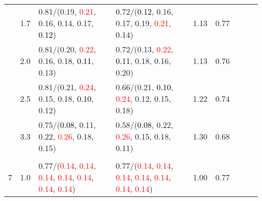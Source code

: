 \documentclass[10pt,a4paper]{report}
\begin{document}
\begin{table}[!htbp]
\begin{center}
{\begin{tabular}{ccllccccc}
				  & 1.7                               & 0.81/(0.19, \textcolor{red}{0.21}, 0.16, 0.14, 0.17, \textcolor{black}{0.12})                                                                                                                 & 0.72/(\textcolor{black}{0.12}, 0.16, 0.17, 0.19, \textcolor{red}{0.21}, 0.14)                                                                                                                 & 1.13             & 0.77                     \\
				  & 2.0                               & 0.81/(0.20, \textcolor{red}{0.22}, 0.16, 0.18, \textcolor{black}{0.11}, 0.13)                                                                                                                 & 0.72/(0.13, \textcolor{red}{0.22}, \textcolor{black}{0.11}, 0.18, 0.16, 0.20)                                                                                                                 & 1.13             & 0.76                     \\
				  & 2.5                               & 0.81/(0.21, \textcolor{red}{0.24}, 0.15, 0.18, \textcolor{black}{0.10}, 0.12)                                                                                                                 & 0.66/(0.21, \textcolor{black}{0.10}, \textcolor{red}{0.24}, 0.12, 0.15, 0.18)                                                                                                                 & 1.22             & 0.74                     \\
				  & 3.3                               & 0.75/(\textcolor{black}{0.08}, 0.11, 0.22, \textcolor{red}{0.26}, 0.18, 0.15)                                                                                                                 & 0.58/(\textcolor{black}{0.08}, 0.22, \textcolor{red}{0.26}, 0.15, 0.18, 0.11)                                                                                                                 & 1.30             & 0.68                     \\
				  &                                   &                                                                                                                                                                                               &                                                                                                                                                                                               &                                             \\
				7 & 1.0                               & 0.77/(\textcolor{red}{0.14}, \textcolor{red}{0.14}, \textcolor{red}{0.14}, \textcolor{red}{0.14}, \textcolor{red}{0.14}, \textcolor{red}{0.14}, \textcolor{red}{0.14})                        & 0.77/(\textcolor{red}{0.14}, \textcolor{red}{0.14}, \textcolor{red}{0.14}, \textcolor{red}{0.14}, \textcolor{red}{0.14}, \textcolor{red}{0.14}, \textcolor{red}{0.14})                        & 1.00             & 0.77                     \\

\end{tabular}}
\end{center}
\end{table}
\end{document}

